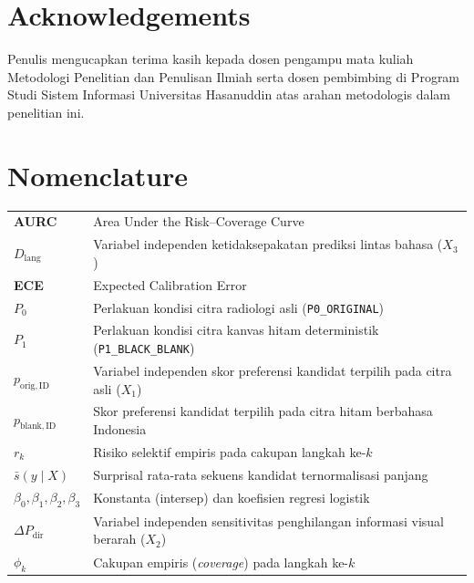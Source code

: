 \documentclass[a4paper,10pt,twoside]{article}
\begin{document}
\section*{Acknowledgements}
Penulis mengucapkan terima kasih kepada dosen pengampu mata kuliah Metodologi Penelitian dan Penulisan Ilmiah serta dosen pembimbing di Program Studi Sistem Informasi Universitas Hasanuddin atas arahan metodologis dalam penelitian ini.

\section*{Nomenclature}
\noindent
\begin{tabular}{@{}p{2.2cm}p{13cm}@{}}
\textbf{AURC} & Area Under the Risk--Coverage Curve \\
$D_{\mathrm{lang}}$ & Variabel independen ketidaksepakatan prediksi lintas bahasa ($X_3$) \\
\textbf{ECE} & Expected Calibration Error \\
$P_0$ & Perlakuan kondisi citra radiologi asli (\texttt{P0\_ORIGINAL}) \\
$P_1$ & Perlakuan kondisi citra kanvas hitam deterministik (\texttt{P1\_BLACK\_BLANK}) \\
$p_{\mathrm{orig,ID}}$ & Variabel independen skor preferensi kandidat terpilih pada citra asli ($X_1$) \\
$p_{\mathrm{blank,ID}}$ & Skor preferensi kandidat terpilih pada citra hitam berbahasa Indonesia \\
$r_k$ & Risiko selektif empiris pada cakupan langkah ke-$k$ \\
$\bar{s}(y \mid X)$ & Surprisal rata-rata sekuens kandidat ternormalisasi panjang \\
$\beta_0, \beta_1, \beta_2, \beta_3$ & Konstanta (intersep) dan koefisien regresi logistik \\
$\Delta P_{\mathrm{dir}}$ & Variabel independen sensitivitas penghilangan informasi visual berarah ($X_2$) \\
$\phi_k$ & Cakupan empiris (\textit{coverage}) pada langkah ke-$k$
\end{tabular}

\vspace{1.5em}
\end{document}

